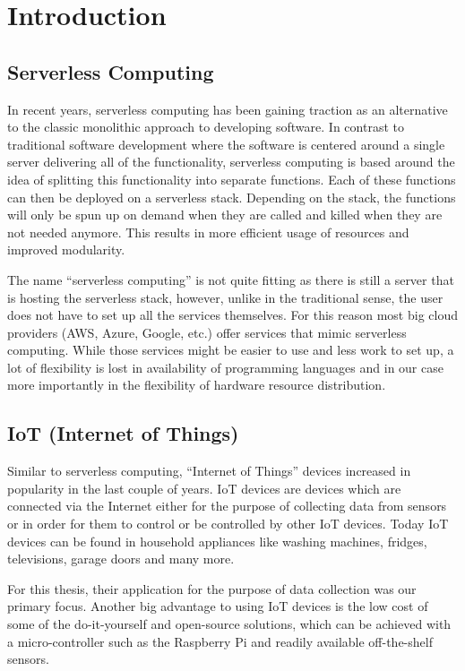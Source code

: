 \section{Introduction}

\subsection{Serverless Computing}

In recent years, serverless computing has been gaining traction as an alternative to the classic
monolithic approach to developing software. In contrast to traditional software development where
the software is centered around a single server delivering all of the functionality, serverless
computing is based around the idea of splitting this functionality into separate functions. Each of
these functions can then be deployed on a serverless stack. Depending on the stack, the functions
will only be spun up on demand when they are called and killed when they are not needed anymore.
This results in more efficient usage of resources and improved modularity.

The name “serverless computing” is not quite fitting as there is still a server that is hosting the
serverless stack, however, unlike in the traditional sense, the user does not have to set up all
the services themselves. For this reason most big cloud providers (AWS, Azure, Google, etc.) offer
services that mimic serverless computing. While those services might be easier to use and less work
to set up, a lot of flexibility is lost in availability of programming languages and in our case
more importantly in the flexibility of hardware resource distribution.

\subsection{IoT (Internet of Things)}

Similar to serverless computing, “Internet of Things” devices increased in popularity in the last
couple of years. IoT devices are devices which are connected via the Internet either for the
purpose of collecting data from sensors or in order for them to control or be controlled by other
IoT devices. Today IoT devices can be found in household appliances like washing machines, fridges,
televisions, garage doors and many more.

For this thesis, their application for the purpose of data collection was our primary
focus. Another big advantage to using IoT devices is the low cost of some of the do-it-yourself and
open-source solutions, which can be achieved with a micro-controller such as the Raspberry Pi and
readily available off-the-shelf sensors.


